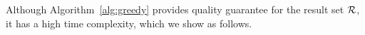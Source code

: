 %


Although Algorithm~\ref{alg:greedy} provides quality guarantee for the result set $\mathcal{R}$, it has a high time complexity, which we show as follows.



